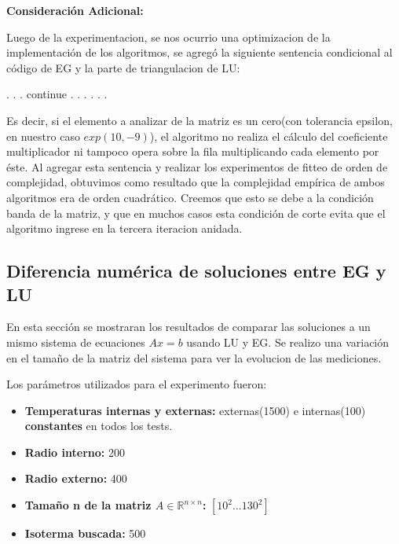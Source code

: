 \textbf{Consideraci\'on Adicional:} 

Luego de la experimentacion, se nos ocurrio una optimizacion de la implementaci\'on de los algoritmos, se agreg\'o la siguiente sentencia condicional al código de EG y la parte de triangulacion de LU:

\begin{algorithmic}
			\State .
			\State .
			\State .
			\State continue
		\EndIf  		
			\State .
			\State .
			\State .
	\EndFor
			\State .
			\State .
			\State .
\end{algorithmic}

Es decir, si el elemento a analizar de la matriz es un cero(con tolerancia epsilon, en nuestro caso $exp(10, -9)$), el algoritmo no realiza el c\'alculo del coeficiente multiplicador ni tampoco opera sobre la fila multiplicando cada elemento por \'este. Al agregar esta sentencia y realizar los experimentos de fitteo de orden de complejidad, obtuvimos como resultado que la complejidad emp\'irica de ambos algoritmos era de orden cuadr\'atico. Creemos que esto se debe a la condición banda de la matriz, y que en muchos casos esta condición de corte evita que el algoritmo ingrese en la tercera iteracion anidada.

\subsection{Diferencia numérica de soluciones entre EG y LU}
En esta sección se mostraran los resultados de comparar las soluciones a un mismo sistema de ecuaciones $Ax=b$ usando LU y EG. Se realizo una variación en el tamaño de la matriz del sistema para ver la evolucion de las mediciones.\\

\vspace{0.3cm}

Los parámetros utilizados para el experimento fueron:
\begin{itemize}
	\item \textbf{Temperaturas internas y externas:}  externas(1500) e internas(100) \textbf{constantes} en todos los tests. 
	\item \textbf{Radio interno:} 200
	\item \textbf{Radio externo:} 400
	\item \textbf{Tamaño n de la matriz $A \in \mathbb{R}^{n \times n}$:} $[10^2\dots130^2]$
	\item \textbf{Isoterma buscada:} 500
\end{itemize}

